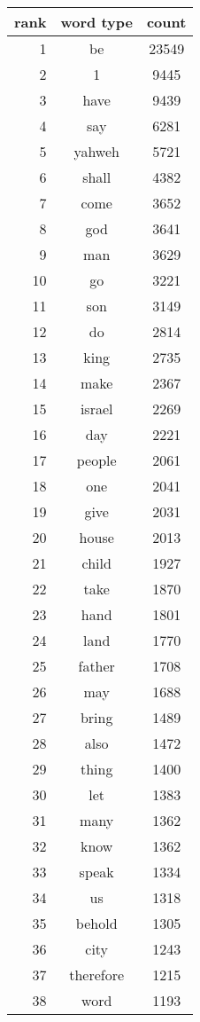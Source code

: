 \begin{figure*}
  \begin{tiny}
  \begin{centering}
  \begin{tabular}{|r|c|c|}
    \hline
    rank & word type & count \\
    \hline
1 & be & 23549 \\
2 & 1 & 9445 \\
3 & have & 9439 \\
4 & say & 6281 \\
5 & yahweh & 5721 \\
6 & shall & 4382 \\
7 & come & 3652 \\
8 & god & 3641 \\
9 & man & 3629 \\
10 & go & 3221 \\
11 & son & 3149 \\
12 & do & 2814 \\
13 & king & 2735 \\
14 & make & 2367 \\
15 & israel & 2269 \\
16 & day & 2221 \\
17 & people & 2061 \\
18 & one & 2041 \\
19 & give & 2031 \\
20 & house & 2013 \\
21 & child & 1927 \\
22 & take & 1870 \\
23 & hand & 1801 \\
24 & land & 1770 \\
25 & father & 1708 \\
26 & may & 1688 \\
27 & bring & 1489 \\
28 & also & 1472 \\
29 & thing & 1400 \\
30 & let & 1383 \\
31 & many & 1362 \\
32 & know & 1362 \\
33 & speak & 1334 \\
34 & us & 1318 \\
35 & behold & 1305 \\
36 & city & 1243 \\
37 & therefore & 1215 \\
38 & word & 1193 \\

\end{tabular}
\end{centering}
\end{tiny}
\end{figure*}
